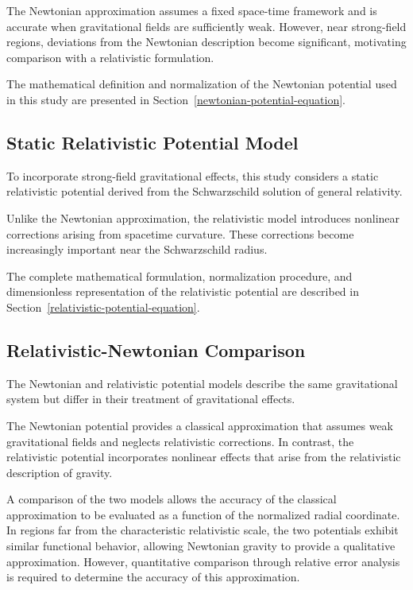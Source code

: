 \documentclass[
]{article}
\begin{document}
The Newtonian approximation assumes a fixed space-time framework and is
accurate when gravitational fields are sufficiently weak. However, near
strong-field regions, deviations from the Newtonian description become
significant, motivating comparison with a relativistic formulation.

The mathematical definition and normalization of the Newtonian potential
used in this study are presented in Section~\ref{newtonian-potential-equation}.

\subsection{Static Relativistic Potential Model}

To incorporate strong-field gravitational effects, this study considers a
static relativistic potential derived from the Schwarzschild solution of
general relativity.

Unlike the Newtonian approximation, the relativistic model introduces
nonlinear corrections arising from spacetime curvature. These corrections
become increasingly important near the Schwarzschild radius.

The complete mathematical formulation, normalization procedure, and
dimensionless representation of the relativistic potential are described
in Section~\ref{relativistic-potential-equation}.

\subsection{Relativistic-Newtonian Comparison}\label{relativisticnewtonian-comparison}

The Newtonian and relativistic potential models describe the same
gravitational system but differ in their treatment of gravitational
effects.

The Newtonian potential provides a classical approximation that assumes
weak gravitational fields and neglects relativistic corrections. In
contrast, the relativistic potential incorporates nonlinear effects that
arise from the relativistic description of gravity.

A comparison of the two models allows the accuracy of the classical
approximation to be evaluated as a function of the normalized radial
coordinate. In regions far from the characteristic relativistic scale,
the two potentials exhibit similar functional behavior, allowing
Newtonian gravity to provide a qualitative approximation. However,
quantitative comparison through relative error analysis is required to
determine the accuracy of this approximation.
\end{document}
